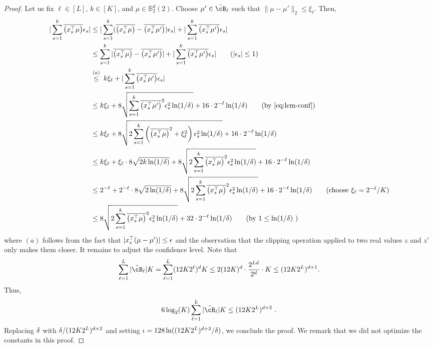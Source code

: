 \begin{proof}
  Let us fix $\ell \in [L]$, $k\in[K]$, and $\mu\in \mathbb{B}_2^d(2)$.
  Choose $\mu'\in \hcB_\ell$ such that $\|\mu - \mu'\|_2 \le\xi_\ell$.
  Then,
  \begin{align*}
    |\sum_{s=1}^{k} \clip{x_s^\T\mu} \eps_s|
    &\le  |\sum_{s=1}^{k} (\clip{x_s^\T\mu} - \clip{x_s^\T\mu'}) \eps_s| + |\sum_{s=1}^{k} \clip{x_s^\T\mu'} \eps_s|
    \\&\le \sum_{s=1}^{k} |\clip{x_s^\T\mu} - \clip{x_s^\T\mu'}| + |\sum_{s=1}^{k} \clip{x_s^\T\mu'} \eps_s| \tag{$|\eps_s|\le 1$}
    \\&\sr{(a)}{\le} k\xi_\ell + |\sum_{s=1}^{k} \clip{x_s^\T \mu'} \eps_s|
    \\&\le           k\xi_\ell + 8\sqrt{\sum_{s=1}^k \clip{x_s^\T\mu'}^2 \eps_s^2\ln(1/\dt)} + 16\cd 2^{-\ell}\ln(1/\dt)  \tag{by~\eqref{eq:lem-conf}}
    \\&\le k\xi_\ell + 8\sqrt{2\sum_{s=1}^k\del{ \clip{x_s^\T\mu}^2+\xi_\ell^2}\eps_s^2\ln(1/\dt)} + 16\cd 2^{-\ell}\ln(1/\dt)
    \\&\le k\xi_\ell +  \xi_\ell \cd 8\sqrt{2k\ln(1/\dt)} + 8\sqrt{2\sum_{s=1}^k \clip{x_s^\T\mu}^2\eps_s^2\ln(1/\dt)} + 16\cd 2^{-\ell}\ln(1/\dt)
    \\&\le           2^{-\ell}+2^{-\ell}\cd 8\sqrt{2\ln(1/\dt)} + 8\sqrt{2\sum_{s=1}^k \clip{x_s^\T\mu}^2\eps_s^2\ln(1/\dt)} + 16\cd 2^{-\ell}\ln(1/\dt)  \tag{choose $\xi_\ell = 2^{-\ell}/K$}
    \\&\le                       8\sqrt{2\sum_{s=1}^k \clip{x_s^\T\mu}^2\eps_s^2\ln(1/\dt)} + 32\cd 2^{-\ell}\ln(1/\dt) 
    \tag{by $1 \le \ln(1/\dt)$ }
  \end{align*}
  where $(a)$ follows from the fact that $|x_s^\top(\mu - \mu')|\le\epsilon$ and the observation that the clipping operation applied to two real values $z$ and $z'$ only makes them closer.
  It remains to adjust the confidence level.
  Note that
  \begin{equation*}
      \sum_{\ell=1}^L |\hcB_\ell|K = \sum_{\ell=1}^L (12K2^\ell)^dK\le 2(12K)^d \cd \frac{2^{Ld}}{2^d}\cd K \le (12K2^L)^{d+1}.
  \end{equation*}
  Thus,
  \begin{align*}
      6\log_2(K)\sum_{\ell=1}^L |\hcB_\ell|K \le (12K2^L)^{d+2}~.
  \end{align*}
  Replacing ${\delta}$ with ${\delta}/(12K2^L)^{d+2} $ and setting $\iota=128\ln((12K2^L)^{d+2}/{\delta})$, we conclude the proof.
  We remark that we did not optimize the constants in this proof. 
\end{proof}




